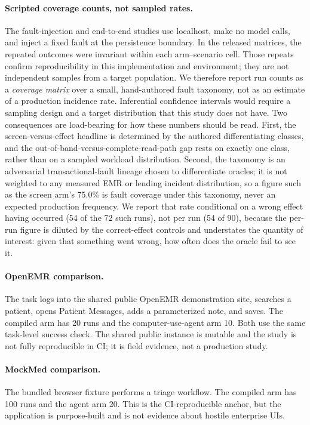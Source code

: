\paragraph{Scripted coverage counts, not sampled rates.}
The fault-injection and end-to-end studies use localhost, make no model calls,
and inject a fixed fault at the persistence boundary. In the released matrices,
the repeated outcomes were invariant within each arm--scenario cell. Those
repeats confirm reproducibility in this implementation and environment; they are
not independent samples from a target population. We therefore report run
counts as a \emph{coverage matrix} over a small, hand-authored fault taxonomy,
not as an estimate of a production incidence rate. Inferential confidence
intervals would require a sampling design and a target distribution that this
study does not have. Two consequences are load-bearing for how these numbers
should be read. First, the screen-versus-effect headline is determined by the
authored differentiating classes, and the out-of-band-versus-complete-read-path
gap rests on exactly one class, rather than on a sampled workload distribution.
Second, the taxonomy is an adversarial transactional-fault lineage
\cite{gray1981transaction} chosen to differentiate oracles; it is not weighted
to any measured EMR or lending incident distribution, so a figure such as the
screen arm's 75.0\% is fault coverage under this taxonomy, never an expected
production frequency. We report that rate conditional on a wrong effect having
occurred (54 of the 72 such runs), not per run (54 of 90), because the per-run
figure is diluted by the correct-effect controls and understates the quantity of
interest: given that something went wrong, how often does the oracle fail to
see it.

\paragraph{OpenEMR comparison.}
The task logs into the shared public OpenEMR demonstration site, searches a
patient, opens Patient Messages, adds a parameterized note, and saves. The
compiled arm has 20 runs and the computer-use-agent arm 10. Both use the same
task-level success check. The shared public instance is mutable and the study is
not fully reproducible in CI; it is field evidence, not a production study.

\paragraph{MockMed comparison.}
The bundled browser fixture performs a triage workflow. The compiled arm has
100 runs and the agent arm 20. This is the CI-reproducible anchor, but the
application is purpose-built and is not evidence about hostile enterprise UIs.


